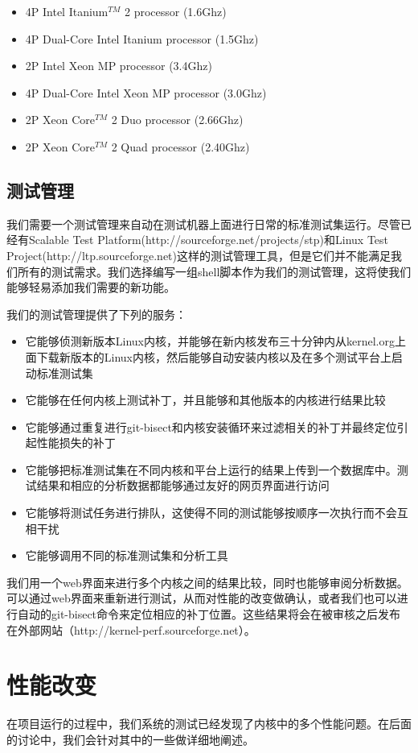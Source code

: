 \begin{itemize}
\item 4P Intel Itanium$^{TM}$ 2 processor (1.6Ghz)
\item 4P Dual-Core Intel Itanium processor (1.5Ghz) 
\item 2P Intel Xeon MP processor (3.4Ghz)
\item 4P Dual-Core Intel Xeon MP processor (3.0Ghz) 
\item 2P Xeon Core$^{TM}$ 2 Duo processor (2.66Ghz)
\item 2P Xeon Core$^{TM}$ 2 Quad processor (2.40Ghz)
\end{itemize}
\subsection{测试管理}
我们需要一个测试管理来自动在测试机器上面进行日常的标准测试集运行。尽管已经有Scalable Test Platform(http://sourceforge.net/projects/stp)和Linux Test Project(http://ltp.sourceforge.net)这样的测试管理工具，但是它们并不能满足我们所有的测试需求。我们选择编写一组shell脚本作为我们的测试管理，这将使我们能够轻易添加我们需要的新功能。

我们的测试管理提供了下列的服务：
\begin{itemize}
\item 它能够侦测新版本Linux内核，并能够在新内核发布三十分钟内从kernel.org上面下载新版本的Linux内核，然后能够自动安装内核以及在多个测试平台上启动标准测试集
\item 它能够在任何内核上测试补丁，并且能够和其他版本的内核进行结果比较
\item 它能够通过重复进行git-bisect和内核安装循环来过滤相关的补丁并最终定位引起性能损失的补丁
\item 它能够把标准测试集在不同内核和平台上运行的结果上传到一个数据库中。测试结果和相应的分析数据都能够通过友好的网页界面进行访问
\item 它能够将测试任务进行排队，这使得不同的测试能够按顺序一次执行而不会互相干扰
\item 它能够调用不同的标准测试集和分析工具
\end{itemize}

我们用一个web界面来进行多个内核之间的结果比较，同时也能够审阅分析数据。可以通过web界面来重新进行测试，从而对性能的改变做确认，或者我们也可以进行自动的git-bisect命令来定位相应的补丁位置。这些结果将会在被审核之后发布在外部网站（http://kernel-perf.sourceforge.net）。


\section{性能改变}
在项目运行的过程中，我们系统的测试已经发现了内核中的多个性能问题。在后面的讨论中，我们会针对其中的一些做详细地阐述。
